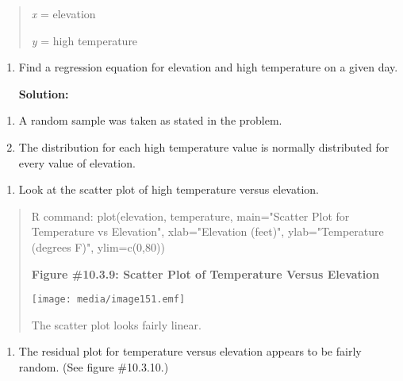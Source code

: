 \documentclass[]{book}
\providecommand{\tightlist}{%
  \setlength{\itemsep}{0pt}\setlength{\parskip}{0pt}}
\begin{document}
\begin{quote}
\emph{x} = elevation

\emph{y} = high temperature
\end{quote}

\begin{enumerate}
\def\labelenumi{\alph{enumi}.}
\setcounter{enumi}{1}
\item
  Find a regression equation for elevation and high temperature on a
  given day.

  \textbf{Solution:}
\end{enumerate}

\begin{enumerate}
\def\labelenumi{\alph{enumi}.}
\item
  A random sample was taken as stated in the problem.
\item
  The distribution for each high temperature value is normally
  distributed for every value of elevation.
\end{enumerate}

\begin{enumerate}
\def\labelenumi{\roman{enumi}.}
\tightlist
\item
  Look at the scatter plot of high temperature versus elevation.
\end{enumerate}

\begin{quote}
R command: plot(elevation, temperature, main="Scatter Plot for
Temperature vs Elevation", xlab="Elevation (feet)",
ylab="Temperature (degrees F)", ylim=c(0,80))

\textbf{Figure \#10.3.9: Scatter Plot of Temperature Versus Elevation}

\texttt{[image: media/image151.emf]}

The scatter plot looks fairly linear.
\end{quote}

\begin{enumerate}
\def\labelenumi{\roman{enumi}.}
\setcounter{enumi}{1}
\tightlist
\item
  The residual plot for temperature versus elevation appears to be
  fairly random. (See figure \#10.3.10.)
\end{enumerate}
\end{document}
